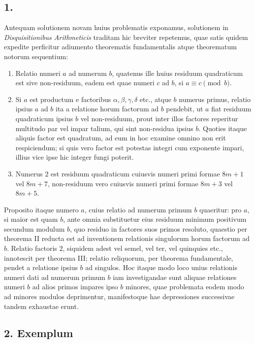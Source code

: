 \documentclass[12pt]{article}
\begin{document}
\subsection*{1.}

Antequam solutionem novam huius problematis exponamus, solutionem in \emph{Disquisitionibus Arithmeticis} traditam hic breviter repetemus, quae satis quidem expedite perficitur adiumento theorematis fundamentalis atque theorematum notorum sequentium:
\begin{enumerate}[label=\Roman*.]
\item Relatio numeri $a$ ad numerum $b$, quatenus ille huius residuum quadraticum est sive non-residuum, eadem est quae numeri $c$ ad $b$, si $a\equiv c\pmod b$.
\item Si $a$ est productum e factoribus $\alpha,\beta,\gamma,\delta$ etc., atque $b$ numerus primus, relatio ipsius $a$ ad $b$ ita a relatione horum factorum ad $b$ pendebit, ut $a$ fiat residuum quadraticum ipsius $b$ vel non-residuum, prout inter illos factores reperitur multitudo par vel impar talium, qui sint non-residua ipsius $b$. Quoties itaque aliquis factor est quadratum, ad eum in hoc examine omnino non erit respiciendum; si quis vero factor est potestas integri cum exponente impari, illius vice ipse hic integer fungi poterit.
\item Numerus $2$ est residuum quadraticum cuiusvis numeri primi formae $8m+1$ vel $8m+7$, non-residuum vero cuiusvis numeri primi formae $8m+3$ vel $8m+5$.
\end{enumerate}

Proposito itaque numero $a$, cuius relatio ad numerum primum $b$ quaeritur: pro $a$, si maior est quam $b$, ante omnia substituetur eius residuum minimum positivum secundum modulum $b$, quo residuo in factores suos primos resoluto, quaestio per theorema II reducta est ad inventionem relationis singulorum horum factorum ad $b$. Relatio factoris $2$, siquidem adest vel semel, vel ter, vel quinquies etc., innotescit per theorema III; relatio reliquorum, per theorema fundamentale, pendet a relatione ipsius $b$ ad singulos. Hoc itaque modo loco unius relationis numeri dati ad numerum primum $b$ iam investigandae sunt aliquae relationes numeri $b$ ad alios primos impares ipso $b$ minores, quae problemata eodem modo ad minores modulos deprimentur, manifestoque hae depressiones successivae tandem exhaustae erunt.

\subsection*{2. Exemplum}
\end{document}

